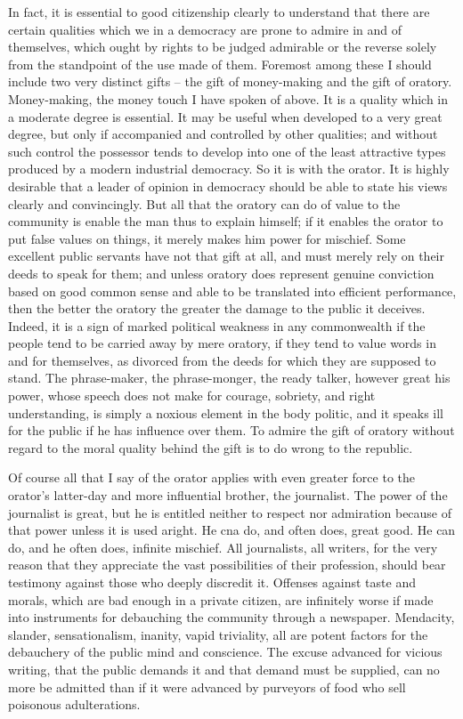 \documentclass[a4paper]{amsbook}
\begin{document}
In fact, it is essential to good citizenship clearly to understand that there are certain qualities which we in a democracy are prone to admire in and of themselves, which ought by rights to be judged admirable or the reverse solely from the standpoint of the use made of them. Foremost among these I should include two very distinct gifts – the gift of money-making and the gift of oratory. Money-making, the money touch I have spoken of above. It is a quality which in a moderate degree is essential. It may be useful when developed to a very great degree, but only if accompanied and controlled by other qualities; and without such control the possessor tends to develop into one of the least attractive types produced by a modern industrial democracy. So it is with the orator. It is highly desirable that a leader of opinion in democracy should be able to state his views clearly and convincingly. But all that the oratory can do of value to the community is enable the man thus to explain himself; if it enables the orator to put false values on things, it merely makes him power for mischief. Some excellent public servants have not that gift at all, and must merely rely on their deeds to speak for them; and unless oratory does represent genuine conviction based on good common sense and able to be translated into efficient performance, then the better the oratory the greater the damage to the public it deceives. Indeed, it is a sign of marked political weakness in any commonwealth if the people tend to be carried away by mere oratory, if they tend to value words in and for themselves, as divorced from the deeds for which they are supposed to stand. The phrase-maker, the phrase-monger, the ready talker, however great his power, whose speech does not make for courage, sobriety, and right understanding, is simply a noxious element in the body politic, and it speaks ill for the public if he has influence over them. To admire the gift of oratory without regard to the moral quality behind the gift is to do wrong to the republic.

Of course all that I say of the orator applies with even greater force to the orator's latter-day and more influential brother, the journalist. The power of the journalist is great, but he is entitled neither to respect nor admiration because of that power unless it is used aright. He cna do, and often does, great good. He can do, and he often does, infinite mischief. All journalists, all writers, for the very reason that they appreciate the vast possibilities of their profession, should bear testimony against those who deeply discredit it. Offenses against taste and morals, which are bad enough in a private citizen, are infinitely worse if made into instruments for debauching the community through a newspaper. Mendacity, slander, sensationalism, inanity, vapid triviality, all are potent factors for the debauchery of the public mind and conscience. The excuse advanced for vicious writing, that the public demands it and that demand must be supplied, can no more be admitted than if it were advanced by purveyors of food who sell poisonous adulterations.
\end{document}

